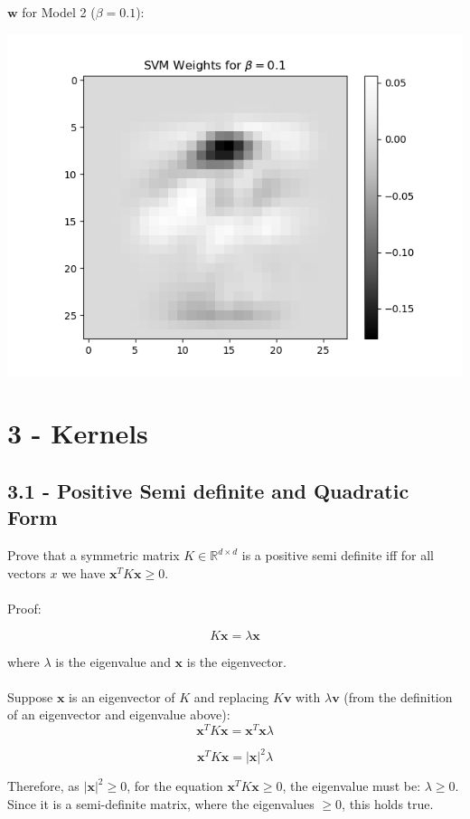 \documentclass[10pt]{article}
\begin{document}
$\textbf{w}$ for Model 2 ($\beta = 0.1 $): 

\begin{center}
\includegraphics[scale=0.5]{2_3_2.png}
\end{center}


\section{3 - Kernels}
\subsection{3.1 - Positive Semi definite and Quadratic Form}

Prove that a symmetric matrix $K \in \mathbb{R}^{d \times d} $ is a positive semi definite iff for all vectors $x$ we have $\textbf{x}^{T}K\textbf{x} \geq 0$.
\\ \\
Proof: 

\[
K\textbf{x} = \lambda \textbf{x}
\]

where $\lambda$ is the eigenvalue and $\textbf{x}$ is the eigenvector. 
\\ \\
Suppose $\textbf{x}$ is an eigenvector of $K$ and replacing $K\textbf{v}$ with $\lambda \textbf{v}$ (from the definition of an eigenvector and eigenvalue above):
\[
\textbf{x}^{T}K\textbf{x} = \textbf{x}^{T} \textbf{x} \lambda
\]

\[
\textbf{x}^{T}K\textbf{x} = |\textbf{x}|^{2} \lambda
\]

Therefore, as $|\textbf{x}|^{2} \geq 0$, for the equation $\textbf{x}^{T}K\textbf{x} \geq 0$, the eigenvalue must be: $\lambda \geq 0$. Since it is a semi-definite matrix, where the eigenvalues $\geq 0$, this holds true.  
\end{document}
